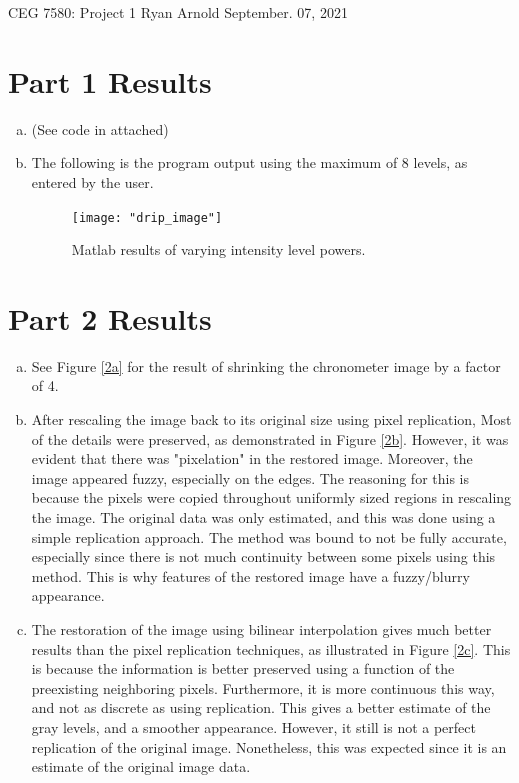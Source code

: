 \documentclass[../report1_rarnold.tex]{subfiles}
\begin{document}
\noindent CEG 7580: Project 1 \hfill Ryan Arnold \hfill September. 07, 2021

\section*{Part 1 Results}

\begin{enumerate}[a.]
  \item (See code in attached)
  
  \item The following is the program output using the maximum of 8 levels, as entered by the user.
  \begin{figure}[htbp]
	\centering
	\texttt{[image: "drip\_image"]}
	\caption{Matlab results of varying intensity level powers.} 
	\label{1a}
	\end{figure}

\end{enumerate}

\section*{Part 2 Results}

\begin{enumerate}[a.]
	\item See Figure \ref{2a} for the result of shrinking the chronometer image by a factor of 4.
	 
	\item  
\noindent After rescaling the image back to its original size using pixel replication, Most of the details were preserved, as demonstrated in Figure \ref{2b}.  However, it was evident that there was "pixelation" in the restored image.  Moreover, the image appeared fuzzy, especially on the edges.  The reasoning for this is because the pixels were copied throughout uniformly sized regions in rescaling the image.  The original data was only estimated, and this was done using a simple replication approach. The method was bound to not be fully accurate, especially since there is not much continuity between some pixels using this method.  This is why features of the restored image have a fuzzy/blurry appearance.


	\item 	  
The restoration of the image using bilinear interpolation gives much better results than the pixel replication techniques, as illustrated in Figure \ref{2c}.  This is because the information is better preserved using a function of the preexisting neighboring pixels.  Furthermore, it is more continuous this way, and not as discrete as using replication.  This gives a better estimate of the gray levels, and a smoother appearance.  However, it still is not a perfect replication of the original image.  Nonetheless, this was expected since it is an estimate of the original image data.

\end{enumerate}
\end{document}
